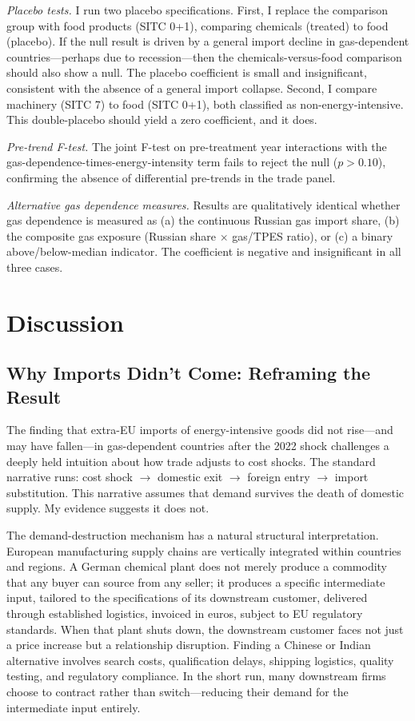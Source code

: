 \documentclass[12pt]{article}
\begin{document}
\textit{Placebo tests.} I run two placebo specifications. First, I replace the comparison group with food products (SITC 0+1), comparing chemicals (treated) to food (placebo). If the null result is driven by a general import decline in gas-dependent countries---perhaps due to recession---then the chemicals-versus-food comparison should also show a null. The placebo coefficient is small and insignificant, consistent with the absence of a general import collapse. Second, I compare machinery (SITC 7) to food (SITC 0+1), both classified as non-energy-intensive. This double-placebo should yield a zero coefficient, and it does.

\textit{Pre-trend F-test.} The joint F-test on pre-treatment year interactions with the gas-dependence-times-energy-intensity term fails to reject the null ($p > 0.10$), confirming the absence of differential pre-trends in the trade panel.

\textit{Alternative gas dependence measures.} Results are qualitatively identical whether gas dependence is measured as (a) the continuous Russian gas import share, (b) the composite gas exposure (Russian share $\times$ gas/TPES ratio), or (c) a binary above/below-median indicator. The coefficient is negative and insignificant in all three cases.


\section{Discussion}
\label{sec:discussion}

\subsection{Why Imports Didn't Come: Reframing the Result}

The finding that extra-EU imports of energy-intensive goods did not rise---and may have fallen---in gas-dependent countries after the 2022 shock challenges a deeply held intuition about how trade adjusts to cost shocks. The standard narrative runs: cost shock $\rightarrow$ domestic exit $\rightarrow$ foreign entry $\rightarrow$ import substitution. This narrative assumes that demand survives the death of domestic supply. My evidence suggests it does not.

The demand-destruction mechanism has a natural structural interpretation. European manufacturing supply chains are vertically integrated within countries and regions. A German chemical plant does not merely produce a commodity that any buyer can source from any seller; it produces a specific intermediate input, tailored to the specifications of its downstream customer, delivered through established logistics, invoiced in euros, subject to EU regulatory standards. When that plant shuts down, the downstream customer faces not just a price increase but a relationship disruption. Finding a Chinese or Indian alternative involves search costs, qualification delays, shipping logistics, quality testing, and regulatory compliance. In the short run, many downstream firms choose to contract rather than switch---reducing their demand for the intermediate input entirely.
\end{document}
